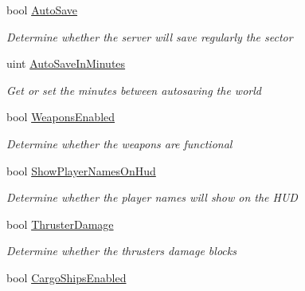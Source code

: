 \begin{DoxyCompactItemize}
bool \hyperlink{class_s_e_mod_a_p_i_1_1_a_p_i_1_1_definitions_1_1_dedicated_config_definition_a8940dc1ea09faf597f80bef843d525b2}{Auto\+Save}
\begin{DoxyCompactList}\small\item\em Determine whether the server will save regularly the sector \end{DoxyCompactList}\item 
uint \hyperlink{class_s_e_mod_a_p_i_1_1_a_p_i_1_1_definitions_1_1_dedicated_config_definition_aa8cf3384611ca01dabbedd7a0944eb29}{Auto\+Save\+In\+Minutes}
\begin{DoxyCompactList}\small\item\em Get or set the minutes between autosaving the world \end{DoxyCompactList}\item 
bool \hyperlink{class_s_e_mod_a_p_i_1_1_a_p_i_1_1_definitions_1_1_dedicated_config_definition_a15c3e4f5822d24b2bda9fa6143ce2b4f}{Weapons\+Enabled}
\begin{DoxyCompactList}\small\item\em Determine whether the weapons are functional \end{DoxyCompactList}\item 
bool \hyperlink{class_s_e_mod_a_p_i_1_1_a_p_i_1_1_definitions_1_1_dedicated_config_definition_a59e8c9cbaec7fd1f0a838d4015e53d85}{Show\+Player\+Names\+On\+Hud}
\begin{DoxyCompactList}\small\item\em Determine whether the player names will show on the H\+U\+D \end{DoxyCompactList}\item 
bool \hyperlink{class_s_e_mod_a_p_i_1_1_a_p_i_1_1_definitions_1_1_dedicated_config_definition_a82b0bf83777c3f0871d45c2574a2ce7e}{Thruster\+Damage}
\begin{DoxyCompactList}\small\item\em Determine whether the thrusters damage blocks \end{DoxyCompactList}\item 
bool \hyperlink{class_s_e_mod_a_p_i_1_1_a_p_i_1_1_definitions_1_1_dedicated_config_definition_acd143bc9b8d728db4e3b0e0998d2de68}{Cargo\+Ships\+Enabled}

\end{DoxyCompactItemize}
